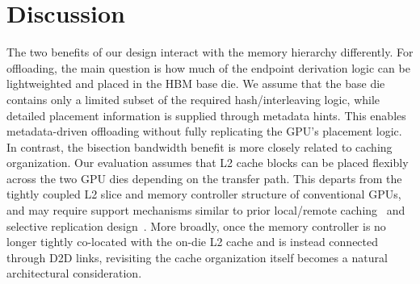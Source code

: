 \section{Discussion}

The two benefits of our design interact with the memory hierarchy differently.
For offloading, the main question is how much of the endpoint derivation logic can be lightweighted and placed in the HBM base die. We assume that the base die contains only a limited subset of the required hash/interleaving logic, while detailed placement information is supplied through metadata hints. This enables metadata-driven offloading without fully replicating the GPU's placement logic.
In contrast, the bisection bandwidth benefit is more closely related to caching organization. Our evaluation assumes that L2 cache blocks can be placed flexibly across the two GPU  dies depending on the transfer path. This departs from the tightly coupled L2 slice and memory controller structure of conventional GPUs, and may require support mechanisms similar to prior local/remote caching~\cite{cache_multichiplet_1, cache_multichiplet_2} and selective replication design~\cite{cache_multichiplet_3, cache_multichiplet_4}.
More broadly, once the memory controller is no longer tightly co-located with the on-die L2 cache and is instead connected through D2D links, revisiting the cache organization itself becomes a natural architectural consideration.


